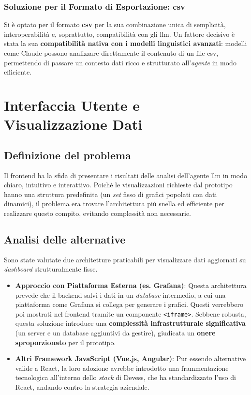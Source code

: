 \subsubsection{Soluzione per il Formato di Esportazione: \gls{csv}}
Si è optato per il formato \textbf{\gls{csv}} per la sua combinazione unica di semplicità, interoperabilità e, soprattutto, compatibilità con gli \gls{llm}. Un fattore decisivo è stata la sua \textbf{compatibilità nativa con i modelli linguistici avanzati}: modelli come Claude possono analizzare direttamente il contenuto di un file \gls{csv}, permettendo di passare un contesto dati ricco e strutturato all'\textit{agente} in modo efficiente.

\newpage
\section{Interfaccia Utente e Visualizzazione Dati}
\label{sec:frontend_analysis}

\subsection{Definizione del problema}
Il \gls{frontend} ha la sfida di presentare i risultati delle analisi dell'agente \gls{llm} in modo chiaro, intuitivo e interattivo. Poiché le visualizzazioni richieste dal prototipo hanno una struttura predefinita (un \textit{set} fisso di grafici popolati con dati dinamici), il problema era trovare l'architettura più snella ed efficiente per realizzare questo compito, evitando complessità non necessarie.

\subsection{Analisi delle alternative}
Sono state valutate due architetture praticabili per visualizzare dati aggiornati su \textit{dashboard} strutturalmente fisse.
\begin{itemize}
    \item \textbf{Approccio con Piattaforma Esterna (es. Grafana)}: Questa architettura prevede che il \gls{backend} salvi i dati in un \textit{database} intermedio, a cui una piattaforma come Grafana si collega per generare i grafici. Questi verrebbero poi mostrati nel \gls{frontend} tramite un componente \texttt{<iframe>}. Sebbene robusta, questa soluzione introduce una \textbf{complessità infrastrutturale significativa} (un server e un database aggiuntivi da gestire), giudicata un \textbf{onere sproporzionato} per il prototipo.
    
    \item \textbf{Altri Framework JavaScript (Vue.js, Angular)}: Pur essendo alternative valide a React, la loro adozione avrebbe introdotto una frammentazione tecnologica all'interno dello \textit{stack} di Devess, che ha standardizzato l'uso di React, andando contro la strategia aziendale.
\end{itemize}

